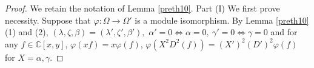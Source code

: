 \documentclass[12pt,reqno]{amsart}
\def\Z{\mathbb{Z}}
\def\C{\mathbb{C}}
\numberwithin{equation}{section}
\begin{document}
\begin{proof}
We retain the notation of Lemma \ref{preth10}.
Part ($\mathrm{I}$) We first prove necessity. Suppose that $\varphi: \Omega\longrightarrow\Omega'$ is a module isomorphism. By Lemma \ref{preth10} (1) and (2), $(\lambda,\zeta,\beta)=(\lambda',\zeta',\beta'),$  $\alpha'=0\iff \alpha=0,\ \gamma'=0\iff\gamma=0$ and for any $f\in\C[x,y]$, $\varphi(xf)=x\varphi(f)$, $\varphi(X^2D^2(f))=(X')^2(D')^2\varphi(f)$ for $X=\alpha,\gamma$.

\end{proof}
\end{document}
